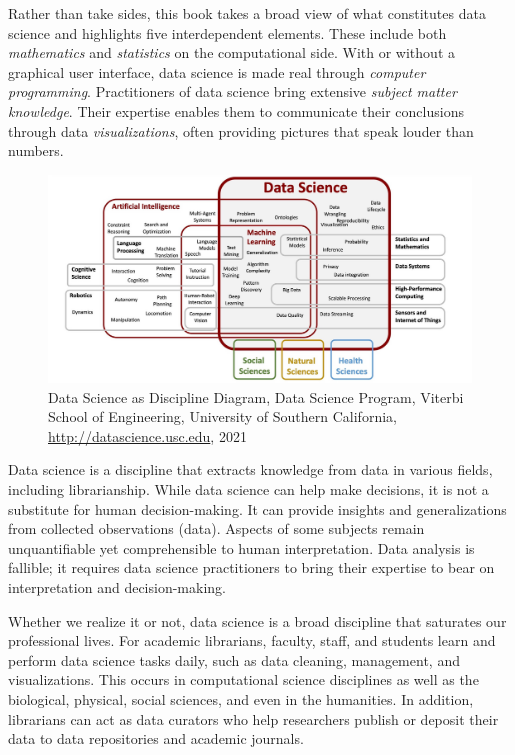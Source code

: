 \documentclass[
  krantz2]{krantz}
\begin{document}
Rather than take sides, this book takes a broad view of what constitutes data science and highlights five interdependent elements. These include both \emph{mathematics} and \emph{statistics} on the computational side. With or without a graphical user interface, data science is made real through \emph{computer programming}. Practitioners of data science bring extensive \emph{subject matter knowledge}. Their expertise enables them to communicate their conclusions through data \emph{visualizations}, often providing pictures that speak louder than numbers.

\begin{figure}
\centering
\includegraphics{images/DS-AI-CS-Graphic-UPDATED-Aug2021.jpeg}
\caption{Data Science as Discipline Diagram, Data Science Program, Viterbi School of Engineering, University of Southern California, \url{http://datascience.usc.edu}, 2021}
\end{figure}

Data science is a discipline that extracts knowledge from data in various fields, including librarianship. While data science can help make decisions, it is not a substitute for human decision-making. It can provide insights and generalizations from collected observations (data). Aspects of some subjects remain unquantifiable yet comprehensible to human interpretation. Data analysis is fallible; it requires data science practitioners to bring their expertise to bear on interpretation and decision-making.

Whether we realize it or not, data science is a broad discipline that saturates our professional lives. For academic librarians, faculty, staff, and students learn and perform data science tasks daily, such as data cleaning, management, and visualizations. This occurs in computational science disciplines as well as the biological, physical, social sciences, and even in the humanities. In addition, librarians can act as data curators who help researchers publish or deposit their data to data repositories and academic journals.
\end{document}

